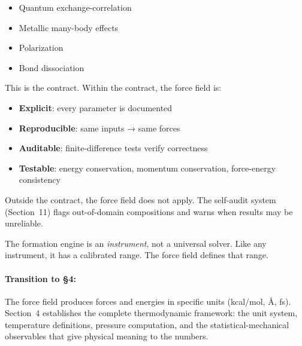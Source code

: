 \documentclass[11pt]{article}
\begin{document}
\begin{itemize}
\item Quantum exchange-correlation
\item Metallic many-body effects
\item Polarization
\item Bond dissociation
\end{itemize}

This is the contract. Within the contract, the force field is:

\begin{itemize}
\item \textbf{Explicit}: every parameter is documented
\item \textbf{Reproducible}: same inputs → same forces
\item \textbf{Auditable}: finite-difference tests verify correctness
\item \textbf{Testable}: energy conservation, momentum conservation, force-energy consistency
\end{itemize}

Outside the contract, the force field does not apply. The self-audit system (Section~11) flags out-of-domain compositions and warns when results may be unreliable.

The formation engine is an \textit{instrument}, not a universal solver. Like any instrument, it has a calibrated range. The force field defines that range.

\paragraph{Transition to \S4:} The force field produces forces and energies in specific units (kcal/mol, \AA, fs). Section~4 establishes the complete thermodynamic framework: the unit system, temperature definitions, pressure computation, and the statistical-mechanical observables that give physical meaning to the numbers.
\end{document}
